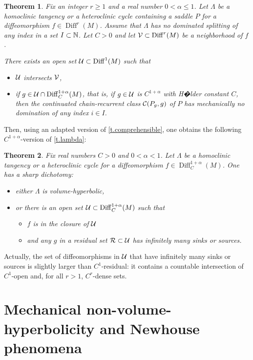 \documentclass[11pt, a4paper]{amsart}
\theoremstyle{plain}
\newtheorem{theorem}{Theorem} %
\theoremstyle{definition}
\theoremstyle{remark}
\numberwithin{equation}{section}         %
\DeclareMathOperator{\Diff}{{Diff}}
\def\Diff{\operatorname{Diff}}
\begin{document}
\begin{theorem}\label{t.robustizationalpha}
Fix an integer $r\geq 1$ and a real number $0<\alpha\leq 1$. Let $\Lambda$ be a homoclinic tangency or a heteroclinic cycle containing a saddle $P$ for a diffeomorphism $f\in \Diff^r(M)$. Assume that $\Lambda$ has no dominated splitting of any index in a set $I\subset {\mathbb N}$. Let $C>0$ and let $\cV\subset \Diff^r(M)$ be a neighborhood of $f$.

There exists an open set $\cU\subset \Diff^1(M)$ such that
\begin{itemize}
\item ${\mathcal U}$ intersects ${\mathcal V}$,
\item if $g\in\cU\cap \Diff^{1+\alpha}_C(M)$, that is, if $g\in {\mathcal U}$ is $C^{1+\alpha}$ with H�lder constant $C$, then the continuated chain-recurrent class ${\mathcal C}(P_g,g)$ of $P$ has mechanically no domination of any index $i\in I$.
\end{itemize}
\end{theorem}

Then, using an adapted version of \cref{t.comprehensible}, one obtains the following $C^{1+\alpha}$-version of \cref{t.lambda}:

\begin{theorem}\label{t.lambdaalpha}
Fix real numbers $C>0$ and $0<\alpha<1$. Let $\Lambda$ be a homoclinic tangency or a heteroclinic cycle for a diffeomorphism $f\in \Diff^{1+\alpha}_C(M)$. One has a sharp dichotomy:
\begin{itemize}
\item either $\Lambda$ is volume-hyperbolic,
\item or there is an open set $\cU\subset \Diff^{1+\alpha}_C(M)$ such that 
 \begin{itemize}
 \item $f$ is in the closure of ${\mathcal U}$
 \item and any $g$ in a residual set ${\mathcal R}\subset {\mathcal U}$ has infinitely many sinks or sources.
\end{itemize}
\end{itemize}
\end{theorem}

Actually, the set of diffeomorphisms in ${\mathcal U}$ that have infinitely many sinks or sources is slightly larger than $C^1$-residual: it contains a countable intersection of $C^1$-open and, for all $r>1$, $C^r$-dense sets.

\section{Mechanical non-volume-hyperbolicity and Newhouse phenomena}\label{s.volhyp}
\end{document}
